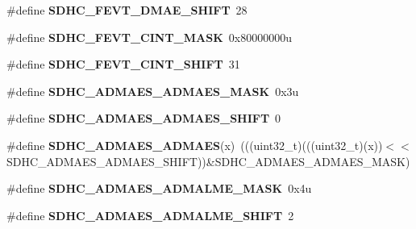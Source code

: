 \begin{DoxyCompactItemize}
\item 
\#define {\bfseries S\+D\+H\+C\+\_\+\+F\+E\+V\+T\+\_\+\+D\+M\+A\+E\+\_\+\+S\+H\+I\+FT}~28\hypertarget{group__SDHC__Register__Masks_ga5899ac8c06de1bf1164fb10a8ee67bde}{}\label{group__SDHC__Register__Masks_ga5899ac8c06de1bf1164fb10a8ee67bde}

\item 
\#define {\bfseries S\+D\+H\+C\+\_\+\+F\+E\+V\+T\+\_\+\+C\+I\+N\+T\+\_\+\+M\+A\+SK}~0x80000000u\hypertarget{group__SDHC__Register__Masks_gab421860ddd2b50ee334649e5cf9f4475}{}\label{group__SDHC__Register__Masks_gab421860ddd2b50ee334649e5cf9f4475}

\item 
\#define {\bfseries S\+D\+H\+C\+\_\+\+F\+E\+V\+T\+\_\+\+C\+I\+N\+T\+\_\+\+S\+H\+I\+FT}~31\hypertarget{group__SDHC__Register__Masks_ga0eb0abd3e2107c4b5d2dc801b3b1a067}{}\label{group__SDHC__Register__Masks_ga0eb0abd3e2107c4b5d2dc801b3b1a067}

\item 
\#define {\bfseries S\+D\+H\+C\+\_\+\+A\+D\+M\+A\+E\+S\+\_\+\+A\+D\+M\+A\+E\+S\+\_\+\+M\+A\+SK}~0x3u\hypertarget{group__SDHC__Register__Masks_gaaf2deb9a73e0aeecdc0ee08497d0165b}{}\label{group__SDHC__Register__Masks_gaaf2deb9a73e0aeecdc0ee08497d0165b}

\item 
\#define {\bfseries S\+D\+H\+C\+\_\+\+A\+D\+M\+A\+E\+S\+\_\+\+A\+D\+M\+A\+E\+S\+\_\+\+S\+H\+I\+FT}~0\hypertarget{group__SDHC__Register__Masks_ga3cc649f6ebd779dc84337a9bc5ae5c0d}{}\label{group__SDHC__Register__Masks_ga3cc649f6ebd779dc84337a9bc5ae5c0d}

\item 
\#define {\bfseries S\+D\+H\+C\+\_\+\+A\+D\+M\+A\+E\+S\+\_\+\+A\+D\+M\+A\+ES}(x)~(((uint32\+\_\+t)(((uint32\+\_\+t)(x))$<$$<$S\+D\+H\+C\+\_\+\+A\+D\+M\+A\+E\+S\+\_\+\+A\+D\+M\+A\+E\+S\+\_\+\+S\+H\+I\+FT))\&S\+D\+H\+C\+\_\+\+A\+D\+M\+A\+E\+S\+\_\+\+A\+D\+M\+A\+E\+S\+\_\+\+M\+A\+SK)\hypertarget{group__SDHC__Register__Masks_gae961b07d5069efed1d1529e087caab7c}{}\label{group__SDHC__Register__Masks_gae961b07d5069efed1d1529e087caab7c}

\item 
\#define {\bfseries S\+D\+H\+C\+\_\+\+A\+D\+M\+A\+E\+S\+\_\+\+A\+D\+M\+A\+L\+M\+E\+\_\+\+M\+A\+SK}~0x4u\hypertarget{group__SDHC__Register__Masks_ga12cecea9616404f0ae9cae658e7c8849}{}\label{group__SDHC__Register__Masks_ga12cecea9616404f0ae9cae658e7c8849}

\item 
\#define {\bfseries S\+D\+H\+C\+\_\+\+A\+D\+M\+A\+E\+S\+\_\+\+A\+D\+M\+A\+L\+M\+E\+\_\+\+S\+H\+I\+FT}~2\hypertarget{group__SDHC__Register__Masks_ga75e811daac256a56735bf2a822440434}{}\label{group__SDHC__Register__Masks_ga75e811daac256a56735bf2a822440434}


\end{DoxyCompactItemize}
